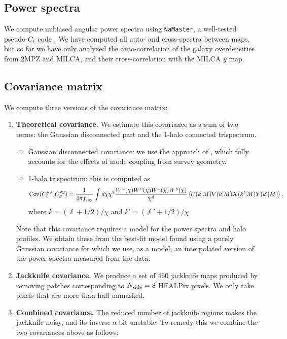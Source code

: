 \documentclass{article}
\begin{document}
  \subsection{Power spectra}
    We compute unbiased angular power spectra using {\tt NaMaster}, a well-tested pseudo-$C_\ell$ code \cite{2019MNRAS.484.4127A}. We have computed all auto- and cross-spectra between maps, but so far we have only analyzed the auto-correlation of the galaxy overdensities from 2MPZ and MILCA, and their cross-correlation with the MILCA $y$ map.

  \subsection{Covariance matrix}
    We compute three versions of the covariance matrix:
    \begin{enumerate}
      \item {\bf Theoretical covariance.} We estimate this covariance as a sum of two terms: the Gaussian disconnected part and the 1-halo connected trispectrum.
            \begin{itemize}
              \item Gaussian disconnected covariance: we use the approach of \cite{2004MNRAS.349..603E}, which fully accounts for the effects of mode coupling from survey geometry.
              \item 1-halo trispectrum: this is computed as
                    \begin{equation}\nonumber
                       {\rm Cov}(C^{uv}_\ell,C^{xy}_{\ell'})=\frac{1}{4\pi f_{\rm sky}}\int {d\chi}{\chi^2}\frac{W^u(\chi)W^v(\chi)W^x(\chi)W^y(\chi)}{\chi^4}\left\langle U(k|M)V(k|M)X(k'|M)Y(k'|M)\right\rangle,
                    \end{equation}
                    where $k=(\ell+1/2)/\chi$ and $k'=(\ell'+1/2)/\chi$.
            \end{itemize}
            Note that this covariance requires a model for the power spectra and halo profiles. We obtain these from the best-fit model found using a purely Gaussian covariance for which we use, as a model, an interpolated version of the power spectra measured from the data.
      \item {\bf Jackknife covariance.} We produce a set of 460 jackknife maps produced by removing patches corresponding to $N_{\rm side}=8$ HEALPix pixels. We only take pixels that are more than half unmasked.
      \item {\bf Combined covariance.} The reduced number of jackknife regions makes the jackknife noisy, and its inverse a bit unstable. To remedy this we combine the two covariances above as follows:

\end{enumerate}
\end{document}
